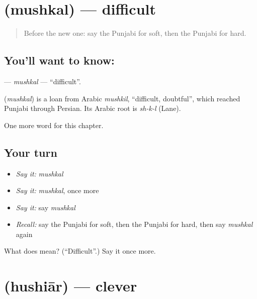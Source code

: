 \section[\texorpdfstring{\pa{ਮੁਸ਼ਕਲ} (mushkal)}{ਮੁਸ਼ਕਲ (mushkal)}]{ (mushkal) — difficult}

\label{lesson:PA-C144-mushkal}



\begin{quote}
Before the new one: say the Punjabi for soft, then the Punjabi for hard.
\end{quote}

\subsection*{You'll want to know: }
\textbf{} — \emph{mushkal} — \textquotedblleft{}difficult\textquotedblright{}.

\begin{cousinweb}
\textbf{} (\emph{mushkal}) is a loan from Arabic \emph{mushkil}, \textquotedblleft{}difficult, doubtful\textquotedblright{}, which reached Punjabi through Persian. Its Arabic root is \emph{sh-k-l} (Lane).
\end{cousinweb}

\begin{grammarlens}[title={What you've built}]
One more word for this chapter.
\end{grammarlens}

\subsection*{Your turn}
\begin{itemize}
\raggedright
  \item \emph{Say it:} \emph{mushkal}
  \item \emph{Say it:} \emph{mushkal}, once more
  \item \emph{Say it:} say \emph{mushkal}
  \item \emph{Recall:} say the Punjabi for soft, then the Punjabi for hard, then say \emph{mushkal} again
\end{itemize}

\begin{tcolorbox}[breakable,colback=teal!4,colframe=teal!35!black,title={Before you move on}]
What does  mean? (\textquotedblleft{}Difficult\textquotedblright{}.) Say it once more.
\end{tcolorbox}
\section[\texorpdfstring{\pa{ਹੁਸ਼ਿਆਰ} (hushiār)}{ਹੁਸ਼ਿਆਰ (hushiār)}]{ (hushiār) — clever}

